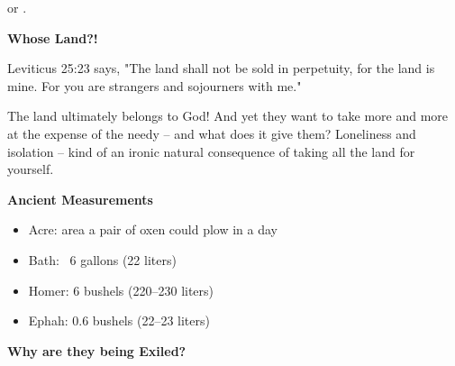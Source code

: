 \documentclass[11pt]{article}
\begin{document}
\begin{chiasticoutline}[Isaiah 5:8-14 (B)]{.95em}{2em}
{        \poetryline or .
    }
     
    

\end{chiasticoutline}


\newpage
{\large\bfseries Whose Land?!}
\vspace{1em}

Leviticus 25:23 says, "The land shall not be sold in perpetuity, for the land is mine. For you are strangers and sojourners with me."

{\vspace{1em}}
The land ultimately belongs to God! And yet they want to take more and more at the expense of the needy – and what does it give them? Loneliness and isolation – kind of an ironic natural consequence of taking all the land for yourself.


\vspace{3em}
{\large\bfseries Ancient Measurements}

\begin{itemize}
    \item Acre: area a pair of oxen could plow in a day
    \item Bath: ~6 gallons (22 liters)
    \item Homer: 6 bushels (220–230 liters)
    \item Ephah: 0.6 bushels (22–23 liters)
\end{itemize}

\vspace{1em}

\vspace{3em}
{\large\bfseries Why are they being Exiled?}
\vspace{1em}
\end{document}
